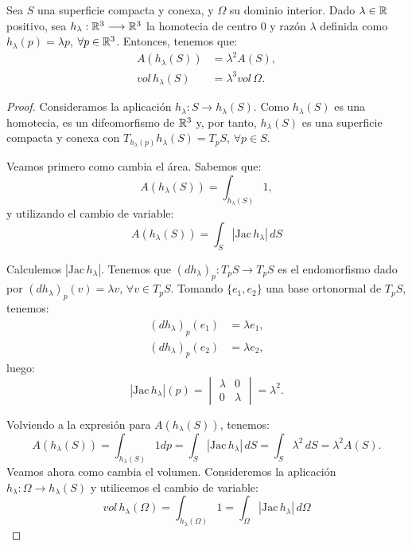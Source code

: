 \begin{lemma}
Sea $S$ una superficie compacta y conexa, y $\Omega$ su dominio interior. Dado $\lambda \in \mathbb{R}$ positivo, sea $h_\lambda: \mathbb{R}^3 \longrightarrow \mathbb{R}^3$ la homotecia de centro $0$ y razón $\lambda$ definida como $h_\lambda(p)=\lambda p$, $\forall p \in \mathbb{R}^3$. Entonces, tenemos que:
%
\begin{align*}
    A(h_\lambda(S)) &= \lambda^2A(S), \\
    vol \, h_\lambda(S) &= \lambda^3 vol \, \Omega.
\end{align*}
\end{lemma}
\begin{proof}
Consideramos la aplicación $h_\lambda: S \longrightarrow h_\lambda(S)$. Como $h_\lambda(S)$ es una homotecia, es un difeomorfismo de $\mathbb{R}^3$ y, por tanto, $h_\lambda(S)$ es una superficie compacta y conexa con $T_{h_\lambda (p)} h_\lambda (S) = T_pS$, $\forall p \in S$.

Veamos primero como cambia el área. Sabemos que:
%
\begin{equation*}
    A(h_\lambda(S)) = \int_{h_\lambda(S)} 1,
\end{equation*}
%
y utilizando el cambio de variable:
%
\begin{equation*}
    A(h_\lambda(S)) = \int_{S} |\text{Jac} \, h_\lambda| \, dS
\end{equation*}

Calculemos $|\text{Jac} \, h_\lambda|$. Tenemos que $(dh_\lambda)_p: T_pS \longrightarrow T_pS$ es el endomorfismo dado por $(dh_\lambda)_p(v) = \lambda v$, $\forall v \in T_pS$. Tomando $\{e_1, e_2\}$ una base ortonormal de $T_pS$, tenemos:
%
\begin{align*}
    (dh_\lambda)_p(e_1) &= \lambda e_1, \\
    (dh_\lambda)_p(e_2) &= \lambda e_2,
\end{align*}
%
luego: 
%
\begin{equation*}
|\text{Jac} \, h_\lambda|(p) = \begin{vmatrix}
\lambda & 0 \\ 
0 & \lambda
\end{vmatrix} = \lambda^2.
\end{equation*}

Volviendo a la expresión para $A(h_\lambda(S))$, tenemos:
%
\begin{equation*}
    A(h_\lambda(S)) = \int_{h_\lambda(S)} 1dp = \int_{S} |\text{Jac} \, h_\lambda| \, dS = \int_{S} \lambda^2 \, dS = \lambda^2A(S).
\end{equation*}
%
Veamos ahora como cambia el volumen. Consideremos la aplicación $h_\lambda: \Omega \longrightarrow h_\lambda(S)$ y utilicemos el cambio de variable:
%
\begin{equation*}
    vol \, h_\lambda(\Omega) = \int_{h_\lambda(\Omega)} 1 = \int_{\Omega} |\text{Jac} \, h_\lambda| \, d\Omega
\end{equation*}


\end{proof}
